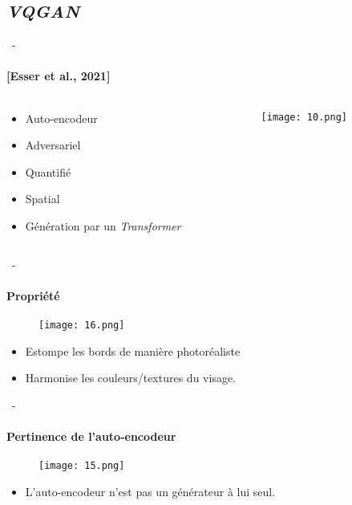 \documentclass[aspectratio=169, 22pt]{beamer}
\begin{document}
\subsection{\emph{VQGAN}}
\begin{frame}{\secname~- \subsecname}
  \framesubtitle{[Esser et al., 2021]}
  \begin{columns}
    \begin{column}{0.2\linewidth}
      \begin{itemize}
      \item \small Auto-encodeur
      \item \small Adversariel
      \item \small Quantifié
      \item \small Spatial
        \vspace{1em}
      \item \small Génération par un \emph{Transformer}
      \end{itemize}
    \end{column}
    \begin{column}{0.8\linewidth}
      \begin{figure}
        \texttt{[image: 10.png]}
      \end{figure}
    \end{column}
  \end{columns}
\end{frame}

\begin{frame}{\secname~- \subsecname}
  \framesubtitle{Propriété}
  \begin{figure}
    \texttt{[image: 16.png]}
  \end{figure}
  \begin{itemize}
  \item \alert{Estompe les bords} de manière photoréaliste
  \item \alert{Harmonise} les couleurs/textures du visage.
\end{itemize}
\end{frame}

\begin{frame}{\secname~- \subsecname}
  \framesubtitle{Pertinence de l'auto-encodeur}
  \begin{figure}
    \texttt{[image: 15.png]}
  \end{figure}
  \begin{itemize}
  \item L'auto-encodeur \alert{n'est pas} un générateur à lui seul.        
  \end{itemize}
\end{frame}
\end{document}
